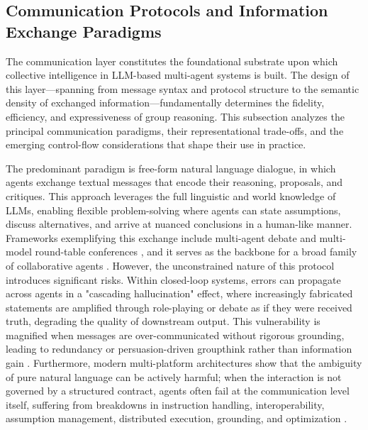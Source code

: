 \documentclass[11pt,a4paper]{article}
\begin{document}
\subsection{Communication Protocols and Information Exchange Paradigms}


The communication layer constitutes the foundational substrate upon which collective intelligence in LLM-based multi-agent systems is built. The design of this layer---spanning from message syntax and protocol structure to the semantic density of exchanged information---fundamentally determines the fidelity, efficiency, and expressiveness of group reasoning. This subsection analyzes the principal communication paradigms, their representational trade-offs, and the emerging control-flow considerations that shape their use in practice.

The predominant paradigm is free-form natural language dialogue, in which agents exchange textual messages that encode their reasoning, proposals, and critiques. This approach leverages the full linguistic and world knowledge of LLMs, enabling flexible problem-solving where agents can state assumptions, discuss alternatives, and arrive at nuanced conclusions in a human-like manner. Frameworks exemplifying this exchange include multi-agent debate and multi-model round-table conferences \cite{arxiv:2305.19118v1,arxiv:2309.13007v2}, and it serves as the backbone for a broad family of collaborative agents \cite{arxiv:2309.07870v3,arxiv:2307.02485v2}. However, the unconstrained nature of this protocol introduces significant risks. Within closed-loop systems, errors can propagate across agents in a "cascading hallucination" effect, where increasingly fabricated statements are amplified through role-playing or debate as if they were received truth, degrading the quality of downstream output. This vulnerability is magnified when messages are over-communicated without rigorous grounding, leading to redundancy or persuasion-driven groupthink rather than information gain \cite{arxiv:2310.02124v2}. Furthermore, modern multi-platform architectures show that the ambiguity of pure natural language can be actively harmful; when the interaction is not governed by a structured contract, agents often fail at the communication level itself, suffering from breakdowns in instruction handling, interoperability, assumption management, distributed execution, grounding, and optimization \cite{arxiv:2407.07061v2}.
\end{document}
